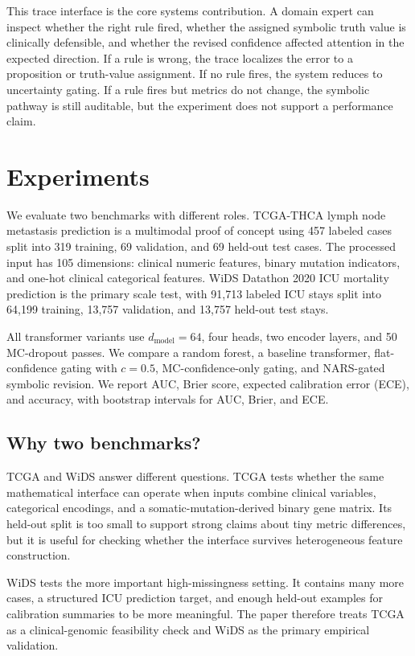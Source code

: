 \documentclass{article}
\begin{document}
This trace interface is the core systems contribution. A domain expert can inspect whether the right rule fired, whether the assigned symbolic truth value is clinically defensible, and whether the revised confidence affected attention in the expected direction. If a rule is wrong, the trace localizes the error to a proposition or truth-value assignment. If no rule fires, the system reduces to uncertainty gating. If a rule fires but metrics do not change, the symbolic pathway is still auditable, but the experiment does not support a performance claim.

\section{Experiments}
\label{sec:experiments}

We evaluate two benchmarks with different roles. TCGA-THCA lymph node metastasis prediction is a multimodal proof of concept using 457 labeled cases split into 319 training, 69 validation, and 69 held-out test cases. The processed input has 105 dimensions: clinical numeric features, binary mutation indicators, and one-hot clinical categorical features. WiDS Datathon 2020 ICU mortality prediction is the primary scale test, with 91,713 labeled ICU stays split into 64,199 training, 13,757 validation, and 13,757 held-out test stays.

All transformer variants use $d_{\text{model}}=64$, four heads, two encoder layers, and 50 MC-dropout passes. We compare a random forest, a baseline transformer, flat-confidence gating with $c=0.5$, MC-confidence-only gating, and NARS-gated symbolic revision. We report AUC, Brier score, expected calibration error (ECE), and accuracy, with bootstrap intervals for AUC, Brier, and ECE.

\subsection{Why two benchmarks?}

TCGA and WiDS answer different questions. TCGA tests whether the same mathematical interface can operate when inputs combine clinical variables, categorical encodings, and a somatic-mutation-derived binary gene matrix. Its held-out split is too small to support strong claims about tiny metric differences, but it is useful for checking whether the interface survives heterogeneous feature construction.

WiDS tests the more important high-missingness setting. It contains many more cases, a structured ICU prediction target, and enough held-out examples for calibration summaries to be more meaningful. The paper therefore treats TCGA as a clinical-genomic feasibility check and WiDS as the primary empirical validation.
\end{document}
